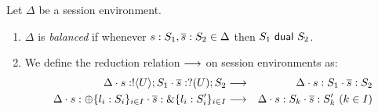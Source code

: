 \begin{definition}\label{d:wtenvred}%
	Let $\Delta$ be a session environment.
	\begin{enumerate}[$\bullet$]
	\item  $\Delta$ is {\em balanced} if whenever
	$s: S_1, \overline{s}: S_2 \in \Delta$ then $S_1 \ \mathsf{dual}\  S_2$.
	\item We define the reduction relation $\longrightarrow$ on session environments as: %
\begin{eqnarray*}
	\Delta \cat s: \btout{U} S_1 \cat \dual{s}: \btinp{U} S_2  & \red & 
	\Delta \cat s: S_1 \cat \dual{s}: S_2  \\
	\Delta \cat s: \btsel{l_i: S_i}_{i \in I} \cat \dual{s}: \btbra{l_i: S_i'}_{i \in I} &\red& \Delta \cat s: S_k \cat \dual{s}: S_k' \ (k \in I)
\end{eqnarray*}
\end{enumerate}
\end{definition}

